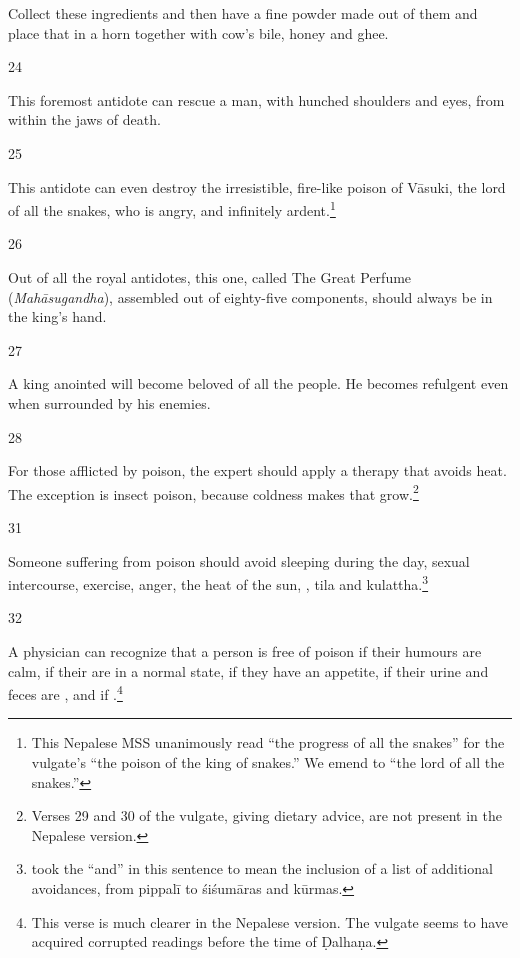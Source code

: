 \begin{translation}
Collect these ingredients and then have a fine powder made out of them and 
place that in a horn together with cow's bile, honey and ghee.

\item [24]

This foremost antidote can rescue a man, with hunched shoulders and 
 eyes, from within the jaws of death.

\item [25]

This antidote can even destroy the irresistible, fire-like poison of
Vāsuki, the lord of all the snakes, who is  angry, and infinitely
ardent.\footnote{This Nepalese MSS unanimously read
     “the progress of all the snakes” for the
    vulgate's  “the poison of the king of snakes.” We
    emend to  “the lord of all the snakes.”}

\item [26]

Out of all the royal antidotes, this one, called The Great Perfume
(\emph{Mahāsugandha}), assembled out of eighty-five components, 
should always be in the king's hand.

\item [27]

A king anointed  will become beloved of all the people.  He 
becomes refulgent even when surrounded by his enemies. 

\item [28]

For those afflicted by poison, the expert should apply a therapy that
avoids heat.  The exception is insect poison, because coldness
makes that grow.\footnote{Verses 29 and 30 of the vulgate, giving dietary 
advice, are not present in the Nepalese version.}

\item[31]

Someone suffering from poison should avoid 
sleeping during the day, sexual intercourse, exercise, anger, the heat of the 
sun, , \gls{tila} and 
\gls{kulattha}.\footnote{ took the “and” in this 
sentence to mean the inclusion of a list of additional avoidances, from 
\gls{pippalī} to 
\glspl{śiśumāra} and \glspl{kūrma}.}


\item[32]

A physician can recognize that a person is free of poison if their 
humours are calm, if their  are in a normal state, 
if they have an appetite, if their urine and feces are , and
if .\footnote{This 
verse is much clearer in the Nepalese version.  The vulgate seems to have 
acquired corrupted readings before the time of Ḍalhaṇa.}

\end{translation}
